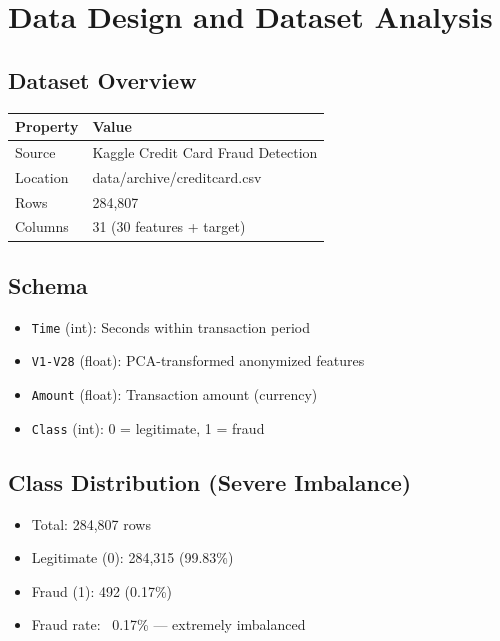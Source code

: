 \documentclass[12pt,a4paper]{article}
\begin{document}
\section{Data Design and Dataset Analysis}

\subsection{Dataset Overview}

\begin{table}[H]
\centering
\begin{tabular}{|l|l|}
\hline
\textbf{Property} & \textbf{Value} \\
\hline
Source & Kaggle Credit Card Fraud Detection \\
Location & data/archive/creditcard.csv \\
Rows & 284,807 \\
Columns & 31 (30 features + target) \\
\hline
\end{tabular}
\end{table}

\subsection{Schema}
\begin{itemize}
    \item \texttt{Time} (int): Seconds within transaction period
    \item \texttt{V1-V28} (float): PCA-transformed anonymized features
    \item \texttt{Amount} (float): Transaction amount (currency)
    \item \texttt{Class} (int): 0 = legitimate, 1 = fraud
\end{itemize}

\subsection{Class Distribution (Severe Imbalance)}
\begin{itemize}
    \item Total: 284,807 rows
    \item Legitimate (0): 284,315 (99.83\%)
    \item Fraud (1): 492 (0.17\%)
    \item Fraud rate: ~0.17\% — extremely imbalanced
\end{itemize}
\end{document}
